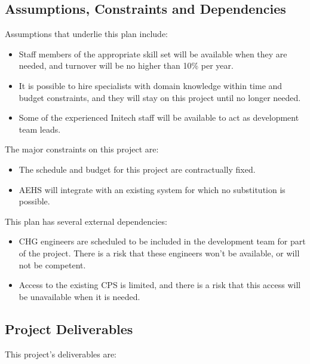 \documentclass[11pt]{article}
\begin{document}
\subsection{Assumptions, Constraints and Dependencies}

Assumptions that underlie this plan include:

\begin{itemize}
\item Staff members of the appropriate skill set will be available when they are needed, and turnover
  will be no higher than 10\% per year.
\item It is possible to hire specialists with domain knowledge within time and budget constraints,
  and they will stay on this project until no longer needed.
\item Some of the experienced Initech staff will be available to act as development team leads.
\end{itemize}

The major constraints on this project are:

\begin{itemize}
\item The schedule and budget for this project are contractually fixed.
\item AEHS will integrate with an existing system for which no substitution is possible.
\end{itemize}

This plan has several external dependencies:

\begin{itemize}
\item CHG engineers are scheduled to be included in the development team for part of the project.
  There is a risk that these engineers won't be available, or will not be competent.
\item Access to the existing CPS is limited, and there is a risk that this access will be
  unavailable when it is needed.
\end{itemize}

\subsection{Project Deliverables}
This project's deliverables are:
\end{document}
